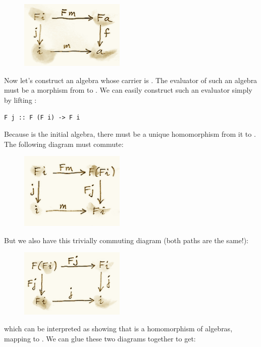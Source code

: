 \begin{figure}[H]
\centering
\includegraphics[width=50mm]{images/alg2.png}
\end{figure}

\noindent
Now let's construct an algebra whose carrier is . The
evaluator of such an algebra must be a morphism from 
to . We can easily construct such an evaluator simply by
lifting :

\begin{Verbatim}[commandchars=\\\{\}]
F j :: F (F i) -> F i
\end{Verbatim}
Because  is the initial algebra, there must be a unique
homomorphism  from it to . The following
diagram must commute:

\begin{figure}[H]
\centering
\includegraphics[width=50mm]{images/alg3a.png}
\end{figure}

\noindent
But we also have this trivially commuting diagram (both paths are the
same!):

\begin{figure}[H]
\centering
\includegraphics[width=50mm]{images/alg3.png}
\end{figure}

\noindent
which can be interpreted as showing that  is a homomorphism of
algebras, mapping  to . We can
glue these two diagrams together to get:

